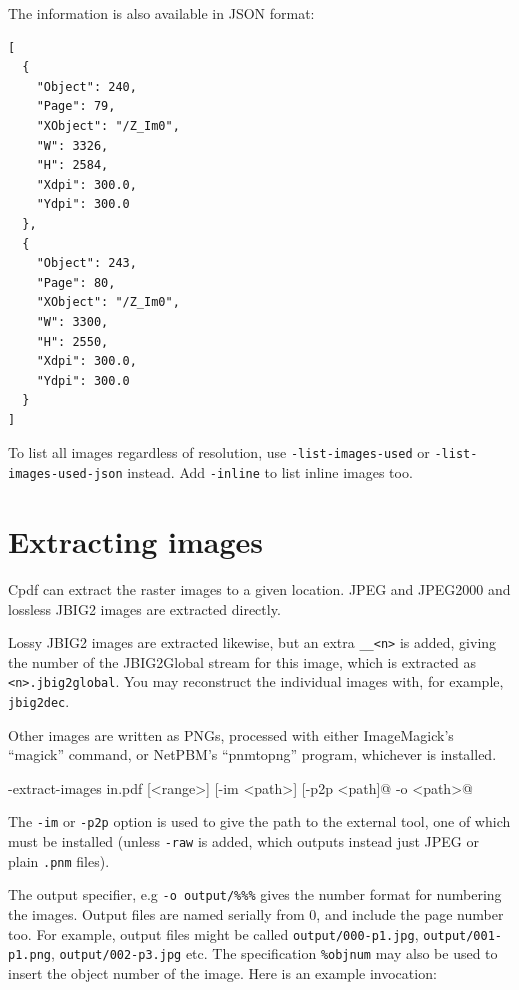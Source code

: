 \documentclass{book}
\begin{document}
The information is also available in JSON format:

\begin{framed}
{\small\begin{verbatim}
[
  {
    "Object": 240,
    "Page": 79,
    "XObject": "/Z_Im0",
    "W": 3326,
    "H": 2584,
    "Xdpi": 300.0,
    "Ydpi": 300.0
  },
  {
    "Object": 243,
    "Page": 80,
    "XObject": "/Z_Im0",
    "W": 3300,
    "H": 2550,
    "Xdpi": 300.0,
    "Ydpi": 300.0
  }
]
\end{verbatim}}
  \end{framed}

\noindent To list all images regardless of resolution, use \texttt{-list-images-used} or \texttt{-list-images-used-json} instead. Add \texttt{-inline} to list inline images too.

\section{Extracting images}

Cpdf can extract the raster images to a given location. JPEG and JPEG2000 and lossless JBIG2 images are extracted directly.

Lossy JBIG2 images are extracted likewise, but an extra \texttt{\_\_<n>} is added, giving the number of the JBIG2Global stream for this image, which is extracted as \texttt{<n>.jbig2global}. You may reconstruct the individual images with, for example, \texttt{jbig2dec}.

Other images are written as PNGs, processed with either ImageMagick's ``magick'' command, or NetPBM's ``pnmtopng'' program, whichever is installed.

  \begin{framed}
  \noindent\small\verb@cpdf -extract-images in.pdf [<range>] [-im <path>] [-p2p <path]@
  \noindent\small{} -o <path>@
  \end{framed}

\noindent The \texttt{-im} or \texttt{-p2p} option is used to give the path to the external tool, one of which must be installed (unless \texttt{-raw} is added, which outputs instead just JPEG or plain \texttt{.pnm} files).

The output specifier, e.g \verb!-o output/%%%! gives the number format for numbering the images. Output files are named serially from 0, and include the page number too. For example, output files might be called \texttt{output/000-p1.jpg}, \texttt{output/001-p1.png}, \texttt{output/002-p3.jpg} etc. The specification \texttt{\%objnum} may also be used to insert the object number of the image. Here is an example invocation:
\end{document}

